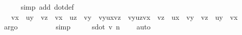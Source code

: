 \begin{isabellebody}
\ \ \ \ \isamarkupfalse%
\ {\isacharparenleft}{\kern0pt}simp\ add{\isacharcolon}{\kern0pt}\ dot{\isacharunderscore}{\kern0pt}def{\isacharparenright}{\kern0pt}\isanewline
\ \ \isamarkupfalse%
\ \isamarkupfalse%
\ {\isachardoublequoteopen}{\isachardot}{\kern0pt}{\isachardot}{\kern0pt}{\isachardot}{\kern0pt}\ {\isacharequal}{\kern0pt}\ vx\ {\isacharasterisk}{\kern0pt}\ uy\ {\isacharasterisk}{\kern0pt}\ vz\ {\isacharminus}{\kern0pt}\ vx\ {\isacharasterisk}{\kern0pt}\ uz\ {\isacharasterisk}{\kern0pt}\ vy\ {\isacharminus}{\kern0pt}\ vy{\isacharasterisk}{\kern0pt}ux{\isacharasterisk}{\kern0pt}vz\ {\isacharplus}{\kern0pt}\ vy{\isacharasterisk}{\kern0pt}uz{\isacharasterisk}{\kern0pt}vx\ {\isacharplus}{\kern0pt}\ vz\ {\isacharasterisk}{\kern0pt}\ ux\ {\isacharasterisk}{\kern0pt}\ vy\ {\isacharminus}{\kern0pt}\ vz\ {\isacharasterisk}{\kern0pt}\ uy\ {\isacharasterisk}{\kern0pt}\ vx{\isachardoublequoteclose}\isanewline
\ \ \ \ \isamarkupfalse%
\ argo\isanewline
\ \ \isamarkupfalse%
\ \isamarkupfalse%
\ {\isachardoublequoteopen}{\isachardot}{\kern0pt}{\isachardot}{\kern0pt}{\isachardot}{\kern0pt}\ {\isacharequal}{\kern0pt}\ {}{\isachardoublequoteclose}\ \isamarkupfalse%
\ simp\isanewline
\ \ \isamarkupfalse%
\ \isamarkupfalse%
\ s{\isacharcolon}{\kern0pt}{\isachardoublequoteopen}dot\ v\ n\ {\isacharequal}{\kern0pt}\ {}{\isachardoublequoteclose}\ \isamarkupfalse%
\ auto\isanewline
{}\isamarkupfalse%
%
\endisatagproof
{\isafoldproof}%
%
\isadelimproof
\isanewline
%
\endisadelimproof
\isanewline
\isanewline
%
\isadelimtheory
\isanewline
%
\endisadelimtheory
%
\isatagtheory
{}\isamarkupfalse%
%
\endisatagtheory
{\isafoldtheory}%
%
\isadelimtheory
%
\endisadelimtheory
%
\end{isabellebody}%
\endinput
